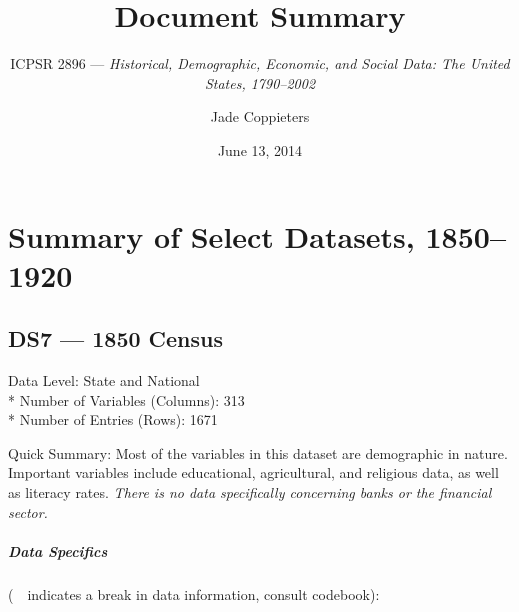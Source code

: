 ﻿\documentclass[12pt]{report}
\title{\Huge \bf Document Summary}
\subtitle{ICPSR 2896 --- \textit{Historical, Demographic, Economic, and Social Data: The United States, 1790--2002}}
\date{June 13, 2014}
\author{Jade Coppieters}
\begin{document}
\maketitle
\tableofcontents
\newpage

\chapter{Summary of Select Datasets, 1850--1920}
\newpage

\section{DS7 --- 1850 Census}
	Data Level: State and National\\*
	Number of Variables (Columns): 313\\*
	Number of Entries (Rows): 1671
	\vspace{1.5em}
	
	\noindent Quick Summary: Most of the variables in this dataset are demographic in nature. Important variables include educational, agricultural, and religious data, as well as literacy rates. \textit{There is no data specifically concerning banks or the financial sector.}
	
	\paragraph{Data Specifics} (\guillemotleft~\guillemotright~indicates a break in data information, consult codebook):
	\vspace{1em}
	
\end{document}
